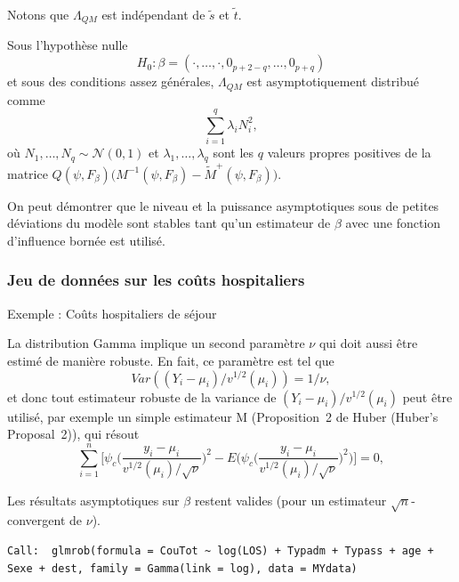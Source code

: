 \documentclass{BeamerTemplate}
\begin{document}
\begin{refsection}
\begin{frame}{}
\bigskip
Notons que $\Lambda_{QM}$ est indépendant de $\tilde{s}$ et $\tilde{t}$.
\end{frame}

\begin{frame}{}
Sous l'hypothèse nulle
$$H_0: \beta = (\cdot, \ldots, \cdot,0_{p+2-q},\ldots,0_{p+q})$$
et sous des conditions assez générales, $\Lambda_{QM}$ est asymptotiquement distribué comme
$$\sum_{i=1}^q \lambda_i N_i^2,$$
où $N_1, \ldots,N_q \sim {\mathcal N}(0,1)$ et $\lambda_1, \ldots, \lambda_q$ sont les $q$ valeurs propres positives de la matrice $Q(\psi,F_{\beta}) \big(M^{-1}(\psi,F_{\beta}) - \tilde{M}^{+}(\psi, F_{\beta}) \big)$.

\bigskip
On peut démontrer que le niveau et la puissance asymptotiques sous de petites déviations du modèle sont stables tant qu'un estimateur de $\beta$ avec une fonction d'influence bornée est utilisé.
\end{frame}

\subsubsection{Jeu de données sur les coûts hospitaliers}

\begin{frame}{Exemple : Coûts hospitaliers de séjour}

La distribution Gamma implique un second paramètre $\nu$ qui doit aussi être estimé de manière robuste. En fait, ce paramètre est tel que
$$Var((Y_i - \mu_i)/v^{1/2}(\mu_i)) =1 / \nu,$$
et donc tout estimateur robuste de la variance de $(Y_i - \mu_i)/v^{1/2}(\mu_i)$ peut être utilisé, par exemple un simple estimateur M (Proposition~2 de Huber (Huber's Proposal~2)), qui résout
\begin{equation*}
\label{nu.eq}
\sum_{i=1}^n \Big[ \psi_c\Big(\frac{y_i-\mu_i}{v^{1/2}(\mu_i)/\sqrt{\nu}} \Big)^2 -
E\Big(\psi_c\big(\frac{y_i-\mu_i}{v^{1/2}(\mu_i)/\sqrt{\nu}}\big)^2\Big) \Big]= 0,
\end{equation*}

\bigskip
Les résultats asymptotiques sur $\beta$ restent valides (pour un estimateur $\sqrt{n}$-convergent de $\nu$).
\end{frame}

\begin{frame}[fragile]{}

{\tiny
\begin{verbatim}
Call:  glmrob(formula = CouTot ~ log(LOS) + Typadm + Typass + age +     
Sexe + dest, family = Gamma(link = log), data = MYdata) 


\end{verbatim}}
\end{frame}
\end{refsection}
\end{document}
